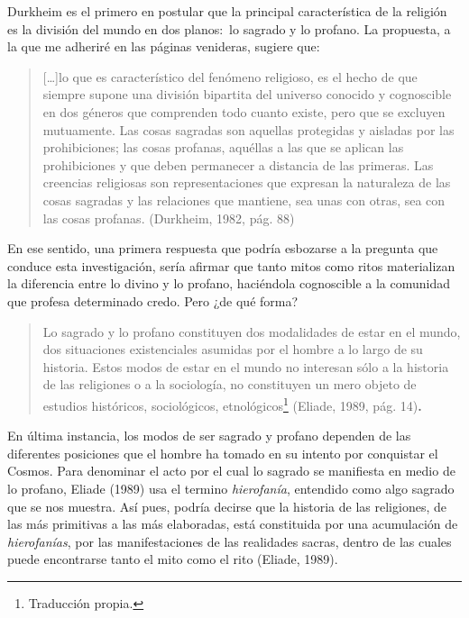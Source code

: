 \begin{refsection}
Durkheim es el primero en postular que la principal característica de la religión es la división del mundo en dos planos:~lo sagrado y lo profano. La propuesta, a la que me adheriré en las páginas venideras, sugiere que:

\begin{quote}
{[}\ldots{}{]}lo que es característico del fenómeno religioso, es el hecho de que siempre supone una división bipartita del universo conocido y cognoscible en dos géneros que comprenden todo cuanto existe, pero que se excluyen mutuamente. Las cosas sagradas son aquellas protegidas y aisladas por las prohibiciones; las cosas profanas, aquéllas a las que se aplican las prohibiciones y que deben permanecer a distancia de las primeras. Las creencias religiosas son representaciones que expresan la naturaleza de las cosas sagradas y las relaciones que mantiene, sea unas con otras, sea con las cosas profanas. (Durkheim, 1982, pág. 88)
\end{quote}

En ese sentido, una primera respuesta que podría esbozarse a la pregunta que conduce esta investigación, sería afirmar que tanto mitos como ritos materializan la diferencia entre lo divino y lo profano, haciéndola cognoscible a la comunidad que profesa determinado credo. Pero ¿de qué forma?

\begin{quote}
Lo sagrado y lo profano constituyen dos modalidades de estar en el mundo, dos situaciones existenciales asumidas por el hombre a lo largo de su historia. Estos modos de estar en el mundo no interesan sólo a la historia de las religiones o a la sociología, no constituyen un mero objeto de estudios históricos, sociológicos, etnológicos\footnote{Traducción propia.} (Eliade, 1989, pág. 14)\textbf{. }
\end{quote}

En última instancia, los modos de ser sagrado y profano dependen de las diferentes posiciones que el hombre ha tomado en su intento por conquistar el Cosmos. Para denominar el acto por el cual lo sagrado se manifiesta en medio de lo profano, Eliade (1989) usa el termino \emph{hierofanía}, entendido como algo sagrado que se nos muestra. Así pues, podría decirse que la historia de las religiones, de las más primitivas a las más elaboradas, está constituida por una acumulación de \emph{hierofanías}, por las manifestaciones de las realidades sacras, dentro de las cuales puede encontrarse tanto el mito como el rito (Eliade, 1989).


\end{refsection}
